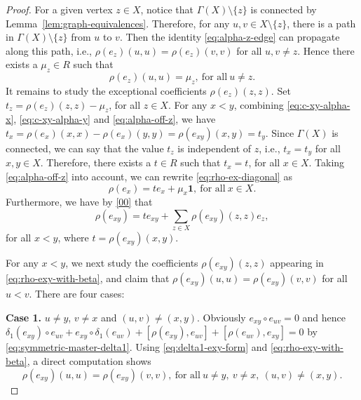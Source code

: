 \documentclass[reqno]{amsart}
\numberwithin{equation}{section}
\theoremstyle{plain}
\theoremstyle{definition}
\newcommand{\one}{\mathbf 1}
\begin{document}
\begin{proof}
For a given vertex $z\in X$, notice that $\Gamma(X)\setminus\{z\}$ is connected by Lemma~\ref{lem:graph-equivalences}.
Therefore, for any $u,v\in X\setminus\{z\}$, there is a path in $\Gamma(X)\setminus\{z\}$ from $u$ to $v$.
Then the identity \eqref{eq:alpha-z-edge} can propagate along this path, i.e.,
$\rho(e_{z})(u,u)=\rho(e_{z})(v,v)$ for all $u,v\neq z$. Hence there exists a $\mu_z\in R$ such that
\begin{equation}\label{eq:alpha-off-z}
\rho(e_{z})(u,u)=\mu_z,~\text{for~all}~u\neq z.
\end{equation}
It remains to study the exceptional coefficients $\rho(e_{z})(z,z)$.
Set $t_z=\rho(e_z)(z,z)-\mu_z$, for all $z\in X$. For any $x<y$, combining \eqref{eq:c-xy-alpha-x}, \eqref{eq:c-xy-alpha-y}
and \eqref{eq:alpha-off-z}, we have $t_x=\rho(e_x)(x,x)-\rho(e_x)(y,y)=\rho(e_{xy})(x,y)=t_y$.
Since $\Gamma(X)$ is connected, we can say that the value $t_z$ is independent of $z$, i.e.,
$t_x=t_y$ for all $x,y\in X$. Therefore, there exists a $t\in R$ such that $t_x=t$, for all $x\in X$.
Taking \eqref{eq:alpha-off-z} into account, we can rewrite \eqref{eq:rho-ex-diagonal} as
\begin{equation}\label{eq:rho-ex-final}
\rho(e_x)=te_x+\mu_x\one, ~\text{for~all}~x\in X.
\end{equation}
Furthermore, we have by \eqref{00} that
\begin{equation}\label{eq:rho-exy-with-beta}
\rho(e_{xy})=te_{xy}+\sum_{z\in X}\rho(e_{xy})(z,z)e_z,
\end{equation}
for all $x<y$, where $t=\rho(e_{xy})(x,y)$.

For any $x<y$, we next study the coefficients $\rho(e_{xy})(z,z)$ appearing in \eqref{eq:rho-exy-with-beta},
and claim that $\rho(e_{xy})(u,u)=\rho(e_{xy})(v,v)$ for all $u<v$. There are four cases:

{\bf Case 1.} $u\neq y$, $v\neq x$ and $(u,v)\neq (x,y)$.
Obviously $e_{xy}\circ e_{uv}=0$ and hence $\delta_1(e_{xy})\circ e_{uv}+e_{xy}\circ\delta_1(e_{uv})+[\rho(e_{xy}),e_{uv}]+[\rho(e_{uv}),e_{xy}]=0$
by \eqref{eq:symmetric-master-delta1}.
Using \eqref{eq:delta1-exy-form} and \eqref{eq:rho-exy-with-beta}, a direct computation shows
\begin{equation}\label{eq:beta-ordinary}
\rho(e_{xy})(u,u)=\rho(e_{xy})(v,v), ~\text{for~all}~ u\neq y,~ v\neq x,~ (u,v)\neq(x,y).
\end{equation}


\end{proof}
\end{document}
